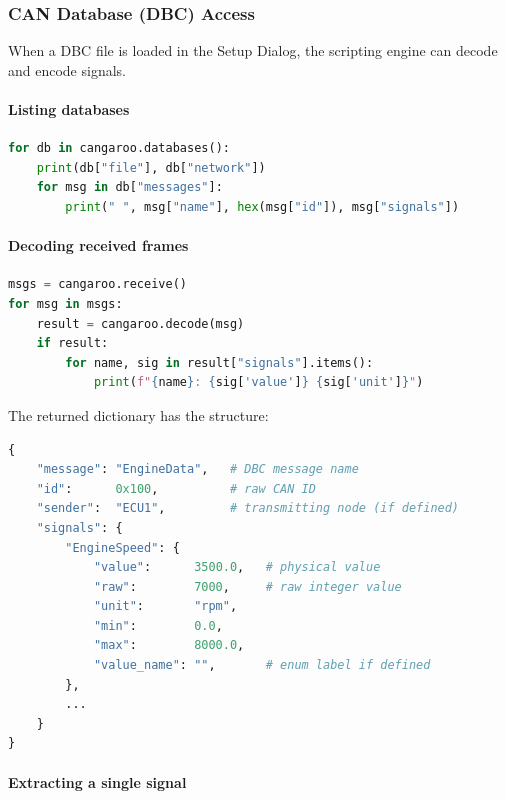 \documentclass[a4paper,11pt]{article}
\begin{document}
\subsubsection{CAN Database (DBC) Access}

When a DBC file is loaded in the Setup Dialog, the scripting engine can decode and
encode signals.

\paragraph{Listing databases}

\begin{lstlisting}[language=Python]
for db in cangaroo.databases():
    print(db["file"], db["network"])
    for msg in db["messages"]:
        print(" ", msg["name"], hex(msg["id"]), msg["signals"])
\end{lstlisting}

\paragraph{Decoding received frames}

\begin{lstlisting}[language=Python, caption={Decode signals from a received frame}]
msgs = cangaroo.receive()
for msg in msgs:
    result = cangaroo.decode(msg)
    if result:
        for name, sig in result["signals"].items():
            print(f"{name}: {sig['value']} {sig['unit']}")
\end{lstlisting}

The returned dictionary has the structure:

\begin{lstlisting}[language=Python]
{
    "message": "EngineData",   # DBC message name
    "id":      0x100,          # raw CAN ID
    "sender":  "ECU1",         # transmitting node (if defined)
    "signals": {
        "EngineSpeed": {
            "value":      3500.0,   # physical value
            "raw":        7000,     # raw integer value
            "unit":       "rpm",
            "min":        0.0,
            "max":        8000.0,
            "value_name": "",       # enum label if defined
        },
        ...
    }
}
\end{lstlisting}

\paragraph{Extracting a single signal}
\end{document}
